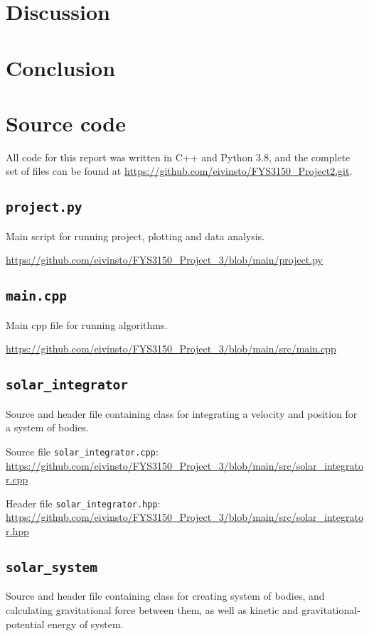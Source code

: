 \documentclass[reprint,english,notitlepage]{revtex4-1}  %
\begin{document}
\section{Discussion} \label{sec:V}

\section{Conclusion} \label{sec:VI}
\onecolumngrid
{}
\newpage
\twocolumngrid

\appendix
\section{Source code} \label{A}
All code for this report was written in C++ and Python 3.8, and the complete set of files can be found at
\url{https://github.com/eivinsto/FYS3150_Project2.git}.

\cprotect\subsection{\verb+project.py+} \label{A.1}
Main script for running project, plotting and data analysis.

\url{https://github.com/eivinsto/FYS3150_Project_3/blob/main/project.py}

\cprotect\subsection{\verb+main.cpp+} \label{A.2}
Main cpp file for running algorithms.

\url{https://github.com/eivinsto/FYS3150_Project_3/blob/main/src/main.cpp}

\cprotect\subsection{\verb+solar_integrator+} \label{A.3}
Source and header file containing class for integrating a velocity and position for a system of bodies.

Source file \verb+solar_integrator.cpp+:
\url{https://github.com/eivinsto/FYS3150_Project_3/blob/main/src/solar_integrator.cpp}

Header file \verb+solar_integrator.hpp+:
\url{https://github.com/eivinsto/FYS3150_Project_3/blob/main/src/solar_integrator.hpp}

\cprotect\subsection{\verb+solar_system+} \label{A.4}
Source and header file containing class for creating system of bodies, and calculating gravitational force between them, as well as kinetic and gravitational-potential energy of system.
\end{document}
